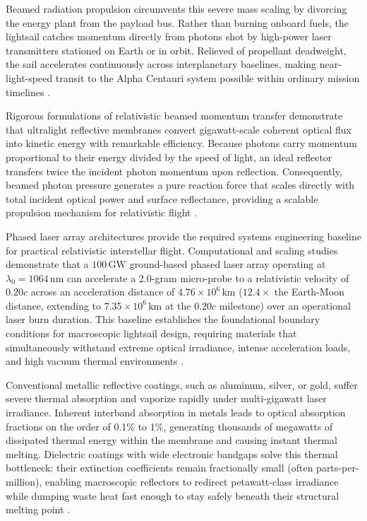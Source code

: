 \documentclass[aps,prd,reprint,superscriptaddress,nofootinbib,floatfix]{revtex4-2}
\begin{document}
Beamed radiation propulsion circumvents this severe mass scaling by divorcing the energy plant from the payload bus. Rather than burning onboard fuels, the lightsail catches momentum directly from photons shot by high-power laser transmitters stationed on Earth or in orbit. Relieved of propellant deadweight, the sail accelerates continuously across interplanetary baselines, making near-light-speed transit to the Alpha Centauri system possible within ordinary mission timelines \cite{ref1}.

Rigorous formulations of relativistic beamed momentum transfer demonstrate that ultralight reflective membranes convert gigawatt-scale coherent optical flux into kinetic energy with remarkable efficiency. Because photons carry momentum proportional to their energy divided by the speed of light, an ideal reflector transfers twice the incident photon momentum upon reflection. Consequently, beamed photon pressure generates a pure reaction force that scales directly with total incident optical power and surface reflectance, providing a scalable propulsion mechanism for relativistic flight \cite{ref2}.

Phased laser array architectures provide the required systems engineering baseline for practical relativistic interstellar flight. Computational and scaling studies demonstrate that a $100\,\mathrm{GW}$ ground-based phased laser array operating at $\lambda_0 = 1064\,\mathrm{nm}$ can accelerate a 2.0-gram micro-probe to a relativistic velocity of $0.20c$ across an acceleration distance of $4.76\times 10^6\,\mathrm{km}$ ($12.4\times$ the Earth-Moon distance, extending to $7.35\times 10^6\,\mathrm{km}$ at the $0.20c$ milestone) over an operational laser burn duration. This baseline establishes the foundational boundary conditions for macroscopic lightsail design, requiring materials that simultaneously withstand extreme optical irradiance, intense acceleration loads, and high vacuum thermal environments \cite{ref3}.

Conventional metallic reflective coatings, such as aluminum, silver, or gold, suffer severe thermal absorption and vaporize rapidly under multi-gigawatt laser irradiance. Inherent interband absorption in metals leads to optical absorption fractions on the order of 0.1\% to 1\%, generating thousands of megawatts of dissipated thermal energy within the membrane and causing instant thermal melting. Dielectric coatings with wide electronic bandgaps solve this thermal bottleneck: their extinction coefficients remain fractionally small (often parts-per-million), enabling macroscopic reflectors to redirect petawatt-class irradiance while dumping waste heat fast enough to stay safely beneath their structural melting point \cite{ref4}.
\end{document}
